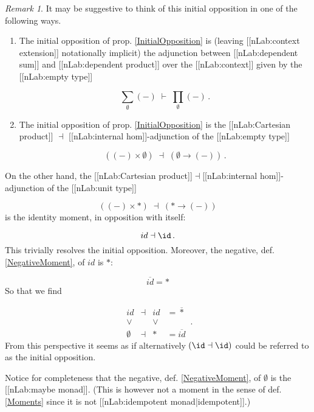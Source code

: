 \documentclass[12pt,titlepage]{article}
\newcommand{\itexarray}[1]{\begin{matrix}#1\end{matrix}}
\theoremstyle{plain}
\theoremstyle{definition}
\theoremstyle{remark}
\newtheorem{remark}{Remark}
\begin{document}
\begin{remark}
\label{AspectsOfTheInitialOpposition}\hypertarget{AspectsOfTheInitialOpposition}{}
It may be suggestive to think of this initial opposition in one of the following ways.

\begin{enumerate}%
\item The initial opposition of prop. \ref{InitialOpposition} is (leaving [[nLab:context extension]] notationally implicit) the adjunction between [[nLab:dependent sum]] and [[nLab:dependent product]] over the [[nLab:context]] given by the [[nLab:empty type]]

\begin{displaymath}
\underset{\emptyset}{\sum}(-)
  \;\vdash\;
  \underset{\emptyset}{\prod}(-)
  \,.
\end{displaymath}

\item The initial opposition of prop. \ref{InitialOpposition} is the [[nLab:Cartesian product]] $\dashv$ [[nLab:internal hom]]-adjunction of the [[nLab:empty type]]

\begin{displaymath}
\left(
     (-) \times \emptyset
   \right)
   \;\dashv\;
   \left(
     \emptyset \to (-)
   \right)
   \,.
\end{displaymath}


\end{enumerate}
On the other hand, the [[nLab:Cartesian product]]$\dashv$[[nLab:internal hom]]-adjunction of the [[nLab:unit type]]

\begin{displaymath}
\left(
     (-) \times \ast
   \right)
   \;\dashv\;
   \left(
     \ast \to (-)
   \right)
\end{displaymath}
is the identity moment, in opposition with itself:

\begin{displaymath}
id \dashv \id
  \,.
\end{displaymath}
This trivially resolves the initial opposition. Moreover, the negative, def. \ref{NegativeMoment}, of $id$ is $\ast$:

\begin{displaymath}
\overline{id} = \ast
\end{displaymath}
So that we find

\begin{displaymath}
\itexarray{
    id &\dashv& id & = \overline{\ast}
    \\
    \vee && \vee
    \\
    \emptyset &\dashv& \ast & = \overline{id}
  }
  \,.
\end{displaymath}
From this perspective it seems as if alternatively $(\id \dashv \id)$ could be referred to as the initial opposition.

Notice for completeness that the negative, def. \ref{NegativeMoment}, of $\emptyset$ is the [[nLab:maybe monad]]. (This is however not a moment in the sense of def. \ref{Moments} since it is not [[nLab:idempotent monad|idempotent]].)

\end{remark}
\end{document}
